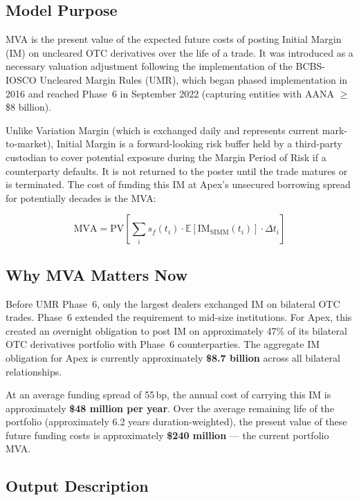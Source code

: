 \documentclass[11pt,a4paper]{article}
\begin{document}
\subsection{Model Purpose}

MVA is the present value of the expected future costs of posting Initial Margin (IM) on
uncleared OTC derivatives over the life of a trade. It was introduced as a necessary valuation
adjustment following the implementation of the BCBS-IOSCO Uncleared Margin Rules (UMR), which
began phased implementation in 2016 and reached Phase~6 in September 2022 (capturing entities
with AANA $\geq$ \$8 billion).

Unlike Variation Margin (which is exchanged daily and represents current mark-to-market),
Initial Margin is a forward-looking risk buffer held by a third-party custodian to cover
potential exposure during the Margin Period of Risk if a counterparty defaults. It is not
returned to the poster until the trade matures or is terminated. The cost of funding this
IM at Apex's unsecured borrowing spread for potentially decades is the MVA:

\begin{equation}
\mathrm{MVA} = \mathrm{PV}\!\left[\sum_i s_f(t_i)\cdot\mathbb{E}\!\left[\mathrm{IM}_{\mathrm{SIMM}}(t_i)\right]\cdot\Delta t_i\right]
\tag{1}
\end{equation}

\subsection{Why MVA Matters Now}

Before UMR Phase~6, only the largest dealers exchanged IM on bilateral OTC trades. Phase~6
extended the requirement to mid-size institutions. For Apex, this created an overnight
obligation to post IM on approximately 47\% of its bilateral OTC derivatives portfolio with
Phase~6 counterparties. The aggregate IM obligation for Apex is currently approximately
\textbf{\$8.7 billion} across all bilateral relationships.

At an average funding spread of 55\,bp, the annual cost of carrying this IM is approximately
\textbf{\$48 million per year}. Over the average remaining life of the portfolio (approximately
6.2 years duration-weighted), the present value of these future funding costs is approximately
\textbf{\$240 million} --- the current portfolio MVA.

\subsection{Output Description}
\end{document}
